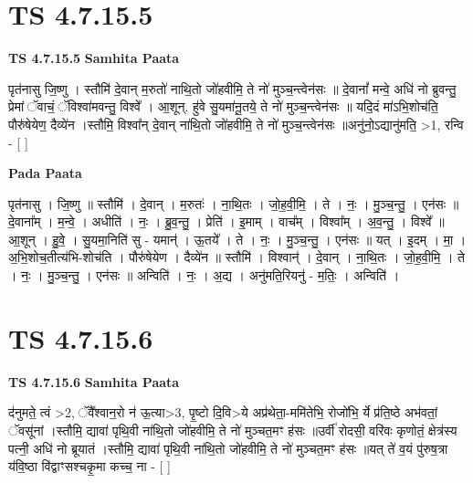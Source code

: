\documentclass[17pt]{extarticle}
\begin{document}
\section*{ TS 4.7.15.5 }

\textbf{TS 4.7.15.5 } \newline
\textbf{Samhita Paata} \newline

पृत॑नासु जि॒ष्णु । स्तौमि॑ दे॒वान् म॒रुतो॑ नाथि॒तो जो॑हवीमि॒ ते नो॑ मुञ्च॒न्त्वेन॑सः ॥ दे॒वानां᳚ मन्वे॒ अधि॑ नो ब्रुवन्तु॒ प्रेमां ॅवाचं॒ ॅविश्वा॑मवन्तु॒ विश्वे᳚ । आ॒शून्. हु॑वे सु॒यमा॑नू॒तये॒ ते नो॑ मुञ्च॒न्त्वेन॑सः ॥ यदि॒दं मा॑ऽभि॒शोच॑ति॒ पौरु॑षेयेण॒ दैव्ये॑न ।स्तौमि॒ विश्वा᳚न् दे॒वान् ना॑थि॒तो जो॑हवीमि॒ ते नो॑ मुञ्च॒न्त्वेन॑सः ॥अनु॑नो॒ऽद्यानु॑मति॒ >1, रन्वि - [  ] \newline

\textbf{Pada Paata} \newline

पृत॑नासु । जि॒ष्णु ॥ स्तौमि॑ । दे॒वान् । म॒रुतः॑ । ना॒थि॒तः । जो॒ह॒वी॒मि॒ । ते । नः॒ । मु॒ञ्च॒न्तु॒ । एन॑सः ॥ दे॒वाना᳚म् । म॒न्वे॒ । अधीति॑ । नः॒ । ब्रु॒व॒न्तु॒ । प्रेति॑ । इ॒माम् । वाच᳚म् । विश्वा᳚म् । अ॒व॒न्तु॒ । विश्वे᳚ ॥ आ॒शून् । हु॒वे॒ । सु॒यमा॒निति॑ सु - यमान्॑ । ऊ॒तये᳚ । ते । नः॒ । मु॒ञ्च॒न्तु॒ । एन॑सः ॥ यत् । इ॒दम् । मा॒ । अ॒भि॒शोच॒तीत्य॑भि-शोच॑ति । पौरु॑षेयेण । दैव्ये॑न ॥ स्तौमि॑ । विश्वान्॑ । दे॒वान् । ना॒थि॒तः । जो॒ह॒वी॒मि॒ । ते । नः॒ । मु॒ञ्च॒न्तु॒ । एन॑सः ॥ अन्विति॑ । नः॒ । अ॒द्य । अनु॑मति॒रियनु॑ - म॒तिः॒ । अन्विति॑ ।  \newline




\section*{ TS 4.7.15.6 }

\textbf{TS 4.7.15.6 } \newline
\textbf{Samhita Paata} \newline

द॑नुमते॒ त्वं >2, ॅवै᳚श्वान॒रो न॑ ऊ॒त्या>3, पृ॒ष्टो दि॒वि>ये अप्र॑थेता॒-ममि॑तेभि॒ रोजो॑भि॒ र्ये प्र॑ति॒ष्ठे अभ॑वतां॒ ॅवसू॑नां ।स्तौमि॒ द्यावा॑ पृथि॒वी ना॑थि॒तो जो॑हवीमि॒ ते नो॑ मुञ्चत॒मꣳ ह॑सः ॥उर्वी॑ रोदसी॒ वरि॑वः कृणोतं॒ क्षेत्र॑स्य पत्नी॒ अधि॑ नो ब्रूयातं ।स्तौमि॒ द्यावा॑ पृथि॒वी ना॑थि॒तो जो॑हवीमि॒ ते नो॑ मुञ्चत॒मꣳ ह॑सः ॥यत् ते॑ व॒यं पु॑रुष॒त्रा य॑वि॒ष्ठा वि॑द्वाꣳसश्चकृ॒मा कच्च॒ ना - [  ] \newline
\end{document}
